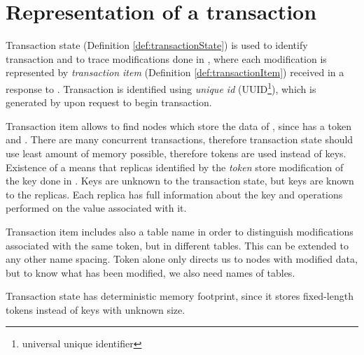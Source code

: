 
\section{Representation of a transaction}


Transaction state (Definition \ref{def:transactionState}) is used to identify transaction \transaction and to trace modifications done in \transaction, where each modification is represented by \emph{transaction item} \txItem (Definition \ref{def:transactionItem}) received in a response to . Transaction \transaction is identified using \emph{unique id} (UUID\footnote{universal unique identifier}), which is generated by  upon request to begin transaction. 

Transaction item allows to find nodes which store the data of \transaction, since \txItem has a token and .
There are many concurrent transactions, therefore transaction state should use least amount of memory possible, therefore tokens are used instead of keys. Existence of a \txItem means that replicas identified by the \emph{token} store modification of the key done in \transaction. Keys are unknown to the transaction state, but keys are known to the replicas. Each replica has full information about the key and operations performed on the value associated with it. 

Transaction item includes also a table name in order to distinguish modifications associated with the same token, but in different tables. This can be extended to any other name spacing.
Token alone only directs us to nodes with modified data, but to know what has been modified, we also need names of tables. 

Transaction state has deterministic memory footprint, since it stores fixed-length tokens instead of keys with unknown size. 


